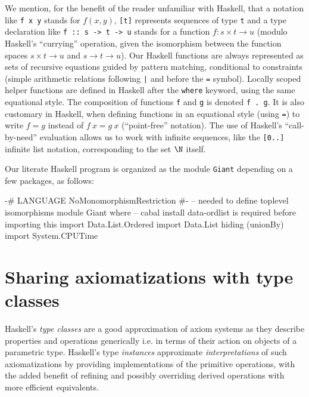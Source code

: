 \documentclass{TOOLS/llncs}
\begin{document}
We mention, for the benefit of the
reader unfamiliar with Haskell, that a notation like {\tt f x y} stands for $f(x,y)$,
{\tt [t]} represents sequences of type {\tt t} and a type declaration
like {\tt f :: s -> t -> u} stands for a function $f: s \times t \to u$
(modulo Haskell's ``currying'' operation, given the isomorphism between 
the function spaces ${s \times t} \to u$ and ${s \to t} \to u$). 
Our Haskell functions are always represented as sets
of recursive equations guided by pattern matching, conditional
to constraints (simple arithmetic relations following \verb~|~ and before
the \verb~=~ symbol).
Locally scoped helper functions are defined in Haskell
after the {\tt where} keyword, using the same equational style.
The composition of functions {\tt f} and {\tt g} is denoted {\tt f . g}.
It is also customary in Haskell, when defining functions in an equational style (using {\tt =})
to write $f=g$ instead of $f~x=g~x$ (``point-free'' notation).
The use of Haskell's ``call-by-need'' evaluation
allows us to work with infinite
sequences, like the {\tt [0..]} infinite list notation, corresponding to the
set $\N$ itself. 

Our literate Haskell program is organized as the module {\tt Giant}
depending on a few packages, as follows:
\begin{code}
{-# LANGUAGE NoMonomorphismRestriction #-}
-- needed to define toplevel isomorphisms
module Giant where
-- cabal install data-ordlist is required before importing this
import Data.List.Ordered
import Data.List hiding (unionBy)
import System.CPUTime
\end{code}

\section{Sharing axiomatizations with type classes} \label{sharing}


Haskell's {\em type classes} \cite{DBLP:conf/popl/WadlerB89} are 
a good approximation of axiom
systems as they describe properties and operations 
generically i.e. in
terms of their action on objects of a parametric type. 
Haskell's type {\em instances}
approximate {\em interpretations} \cite{kaye07} of such axiomatizations by
providing implementations of the primitive operations, with the added benefit of
refining and possibly
overriding derived operations with more efficient equivalents.
\end{document}
